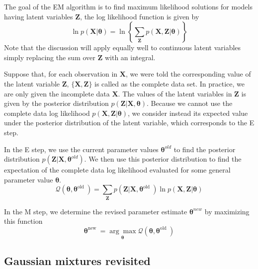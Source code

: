 \documentclass[5p,sort&compress]{elsarticle}
\begin{document}
The goal of the EM algorithm is to find maximum likelihood solutions for models having latent variables $\mathbf{Z}$, the log likelihood function is given by
\begin{equation}
\ln p(\mathbf{X} | \boldsymbol{\theta})=\ln \left\{\sum_{\mathbf{Z}} p(\mathbf{X}, \mathbf{Z} | \boldsymbol{\theta})\right\}
\end{equation}
Note that the discussion will apply equally well to continuous latent variables simply replacing the sum over $\mathbf{Z}$ with an integral.

Suppose that, for each observation in $\mathbf{X}$, we were told the corresponding value of the latent variable $\mathbf{Z}$, $\{\mathbf{X}, \mathbf{Z}\}$ is called as the complete data set. In practice, we are only given the incomplete data $\mathbf{X}$. The values of the latent variables in $\mathbf{Z}$ is given by the posterior distribution $p(\mathbf{Z}|\mathbf{X}, \boldsymbol{\theta})$. Because we cannot use the complete data log likelihood $p(\mathbf{X}, \mathbf{Z} | \boldsymbol{\theta})$, we consider instead its expected value under the posterior distribution of the latent variable, which corresponds to the E step. 

In the E step, we use the current parameter values $\boldsymbol{\theta}^{old}$ to find the posterior distribution $p(\mathbf{Z}|\mathbf{X}, \boldsymbol{\theta}^{old})$. We then use this posterior distribution to find the expectation of the complete data log likelihood evaluated for some general parameter value $\boldsymbol{\theta}$.
\begin{equation}
\mathcal{Q}\left(\boldsymbol{\theta}, \boldsymbol{\theta}^{\text {old }}\right)=\sum_{\mathbf{Z}} p\left(\mathbf{Z} | \mathbf{X}, \boldsymbol{\theta}^{\text {old }}\right) \ln p(\mathbf{X}, \mathbf{Z} | \boldsymbol{\theta})
\end{equation}

In the M step, we determine the revised parameter estimate $\boldsymbol{\theta}^{new}$ by maximizing this function
\begin{equation}
\boldsymbol{\theta}^{\text {new }}=\underset{\boldsymbol{\theta}}{\arg \max } \mathcal{Q}\left(\boldsymbol{\theta}, \boldsymbol{\theta}^{\text {old }}\right)
\end{equation}


\subsection{Gaussian mixtures revisited}
\end{document}
